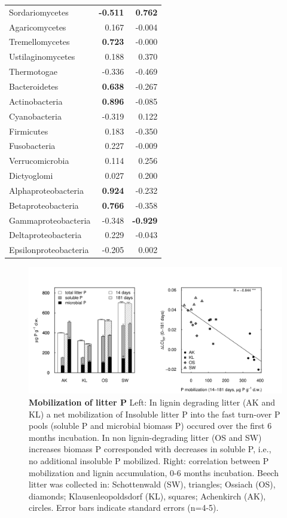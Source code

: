 \documentclass[10pt]{article}
\begin{document}
\begin{flushleft}
\begin{table}[h!]
{\begin{tabular}{lrr}
  Sordariomycetes & \textbf{ -0.511 } & \textbf{ 0.762 } \\ 
  Agaricomycetes & 0.167 & -0.004 \\ 
  Tremellomycetes & \textbf{ 0.723 } & -0.000 \\ 
  Ustilaginomycetes & 0.188 & 0.370 \\ 
  Thermotogae & -0.336 & -0.469 \\ 
  Bacteroidetes & \textbf{ 0.638 } & -0.267 \\ 
  Actinobacteria & \textbf{ 0.896 } & -0.085 \\ 
  Cyanobacteria & -0.319 & 0.122 \\ 
  Firmicutes & 0.183 & -0.350 \\ 
  Fusobacteria & 0.227 & -0.009 \\ 
  Verrucomicrobia & 0.114 & 0.256 \\ 
  Dictyoglomi & 0.027 & 0.200 \\ 
  Alphaproteobacteria & \textbf{ 0.924 } & -0.232 \\ 
  Betaproteobacteria & \textbf{ 0.766 } & -0.358 \\ 
  Gammaproteobacteria & -0.348 & \textbf{ -0.929 } \\ 
  Deltaproteobacteria & 0.229 & -0.043 \\ 
  Epsilonproteobacteria & -0.205 & 0.002 \\ 
   \hline
\end{tabular}
}
\end{table}
\begin{figure}[p]
\begin{center}
\includegraphics{ligpaper-figphos}
\caption{
{\bf Mobilization of litter P} Left: In lignin degrading litter (AK and KL) a net mobilization of Insoluble litter P into the fast turn-over P pools (soluble P and microbial biomass P) occured over the first 6 months incubation. In non lignin-degrading litter (OS and SW) increases biomass P corresponded with decreases in soluble P, i.e., no additional insoluble P mobilized. Right: correlation between P mobilization and lignin accumulation, 0-6 months incubation. Beech litter was collected in: Schottenwald (SW), triangles; Ossiach (OS), diamonds; Klausenleopoldsdorf (KL), squares; Achenkirch (AK), circles. Error bars indicate standard errors (n=4-5).}
\end{center}
\end{figure}


\end{flushleft}
\end{document}
